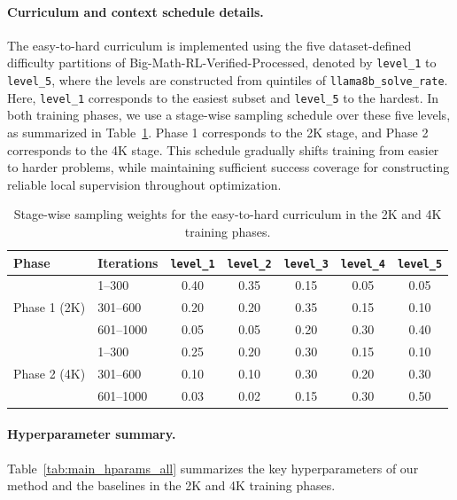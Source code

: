 \documentclass{article}
\begin{document}
\paragraph{Curriculum and context schedule details.}
The easy-to-hard curriculum is implemented using the five dataset-defined difficulty partitions of Big-Math-RL-Verified-Processed, denoted by \texttt{level\_1} to \texttt{level\_5}, where the levels are constructed from quintiles of \texttt{llama8b\_solve\_rate}. Here, \texttt{level\_1} corresponds to the easiest subset and \texttt{level\_5} to the hardest. In both training phases, we use a stage-wise sampling schedule over these five levels, as summarized in Table~\ref{tab:curriculum_schedule}. Phase 1 corresponds to the 2K stage, and Phase 2 corresponds to the 4K stage. This schedule gradually shifts training from easier to harder problems, while maintaining sufficient success coverage for constructing reliable local supervision throughout optimization.

\begin{table}[htbp]
\centering
\small
\setlength{\tabcolsep}{4.5pt}
\renewcommand{\arraystretch}{1.1}
\begin{tabular}{llccccc}
\toprule
Phase & Iterations & \texttt{level\_1} & \texttt{level\_2} & \texttt{level\_3} & \texttt{level\_4} & \texttt{level\_5} \\
\midrule
\multirow{3}{*}{Phase 1 (2K)}
& 1--300    & 0.40 & 0.35 & 0.15 & 0.05 & 0.05 \\
& 301--600  & 0.20 & 0.20 & 0.35 & 0.15 & 0.10 \\
& 601--1000 & 0.05 & 0.05 & 0.20 & 0.30 & 0.40 \\
\midrule
\multirow{3}{*}{Phase 2 (4K)}
& 1--300    & 0.25 & 0.20 & 0.30 & 0.15 & 0.10 \\
& 301--600  & 0.10 & 0.10 & 0.30 & 0.20 & 0.30 \\
& 601--1000 & 0.03 & 0.02 & 0.15 & 0.30 & 0.50 \\
\bottomrule
\end{tabular}
\caption{Stage-wise sampling weights for the easy-to-hard curriculum in the 2K and 4K training phases.}
\label{tab:curriculum_schedule}
\end{table}

\FloatBarrier

\paragraph{Hyperparameter summary.}
Table~\ref{tab:main_hparams_all} summarizes the key hyperparameters of our method and the baselines in the 2K and 4K training phases.
\end{document}
